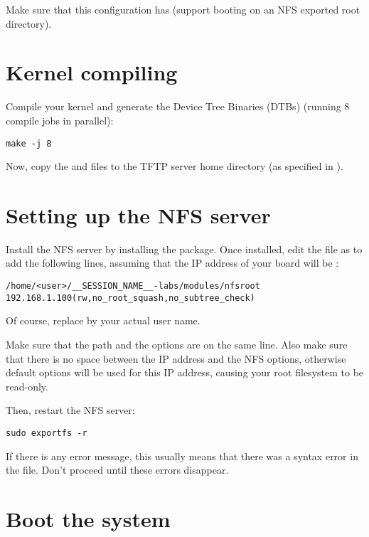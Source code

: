 Make sure that this configuration has  (support
booting on an NFS exported root directory).

\section{Kernel compiling}

Compile your kernel and generate the Device Tree Binaries (DTBs)
(running 8 compile jobs in parallel):

\begin{verbatim}
make -j 8
\end{verbatim}

Now, copy the  and  files to the
TFTP server home directory (as specified in ).

\section{Setting up the NFS server}

Install the NFS server by installing the 
package. Once installed, edit the  file as
 to add the following lines, assuming that the IP address
of your board will be :

\scriptsize
\begin{verbatim}
/home/<user>/__SESSION_NAME__-labs/modules/nfsroot 192.168.1.100(rw,no_root_squash,no_subtree_check)
\end{verbatim}
\normalsize

Of course, replace  by your actual user name.

Make sure that the path and the options are on the same line.
Also make sure that there is no space between the IP address and the NFS
options, otherwise default options will be used for this IP address,
causing your root filesystem to be read-only.

Then, restart the NFS server:

\begin{verbatim}
sudo exportfs -r
\end{verbatim}

If there is any error message, this usually means that there was a
syntax error in the  file. Don't proceed until these
errors disappear.

\section{Boot the system}

